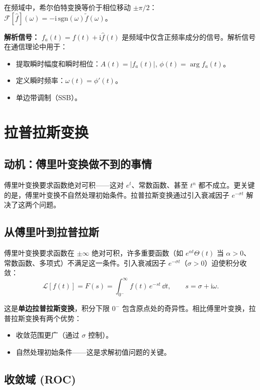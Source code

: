 在频域中，希尔伯特变换等价于相位移动 $\pm\pi/2$：$\mathcal{F}[\hat{f}](\omega) = -\mathrm{i}\,\mathrm{sgn}(\omega)\tilde{f}(\omega)$。

\textbf{解析信号：} $f_a(t) = f(t) + \mathrm{i}\hat{f}(t)$ 是频域中仅含正频率成分的信号。解析信号在通信理论中用于：
\begin{itemize}
\item 提取瞬时幅度和瞬时相位：$A(t) = |f_a(t)|$, $\phi(t) = \arg f_a(t)$。
\item 定义瞬时频率：$\omega(t) = \phi'(t)$。
\item 单边带调制（SSB）。
\end{itemize}

\section{拉普拉斯变换}
\label{sec:laplace}

\subsection*{动机：傅里叶变换做不到的事情}

傅里叶变换要求函数绝对可积——这对 $e^{t}$、常数函数、甚至 $t^n$ 都不成立。更关键的是，傅里叶变换不自然处理初始条件。拉普拉斯变换通过引入衰减因子 $e^{-\sigma t}$ 解决了这两个问题。

\subsection{从傅里叶到拉普拉斯}

傅里叶变换要求函数在 $\pm\infty$ 绝对可积，许多重要函数（如 $e^{\alpha t}\Theta(t)$ 当 $\alpha>0$、常数函数、多项式）不满足这一条件。引入衰减因子 $e^{-\sigma t}$（$\sigma>0$）迫使积分收敛：
\begin{equation}
\mathcal{L}[f(t)] = F(s)
= \int_{0^-}^{\infty} f(t)\,e^{-st}\,\dd t,\qquad s = \sigma + \mathrm{i}\omega.
\label{eq:laplace_transform}
\end{equation}

这是\textbf{单边拉普拉斯变换}，积分下限 $0^-$ 包含原点处的奇异性。相比傅里叶变换，拉普拉斯变换有两个优势：
\begin{itemize}
\item 收敛范围更广（通过 $\sigma$ 控制）。
\item 自然处理初始条件——这是求解初值问题的关键。
\end{itemize}

\subsection{收敛域 (ROC)}

